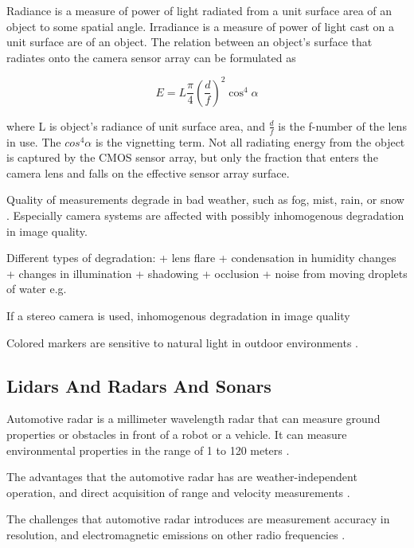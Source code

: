 \documentclass[12pt,a4paper,oneside,pdftex]{report}
\begin{document}
Radiance is a measure of power of light radiated from a unit surface area of an object to some spatial angle. 
Irradiance is a measure of power of light cast on a unit surface are of an object.
The relation between an object's surface that radiates onto the camera sensor array can be formulated as

\begin{equation}
\label{equation:radiance}
E = L \frac{\pi}{4} (\frac{d}{f})^2 \cos^4{\alpha}
\end{equation}

where L is object's radiance of unit surface area, and $\frac{d}{f}$ is the f-number of the lens in use. The $cos^4{\alpha}$ is the vignetting term. Not all radiating energy from the object is captured by the CMOS sensor array, but only the fraction that enters the camera lens and falls on the effective sensor array surface.


Quality of measurements degrade in bad weather, such as fog, mist, rain, or snow \cite{Kawai12}. 
Especially camera systems are affected with possibly inhomogenous degradation in image quality.

Different types of degradation:
    + lens flare
    + condensation in humidity changes
    + changes in illumination
    + shadowing
    + occlusion
    + noise from moving droplets of water e.g.

If a stereo camera is used, inhomogenous degradation in image quality


Colored markers are sensitive to natural light in outdoor environments \cite{Kawai12}.

    
\subsection{Lidars And Radars And Sonars}
\label{subsection:lidars_and_radars_and_sonars}

Automotive radar is a millimeter wavelength radar that can measure ground properties or obstacles in front of a robot or a vehicle. It can measure environmental properties in the range of 1 to 120 meters \cite{Ahtiainen12}.

The advantages that the automotive radar has are weather-independent operation, and direct acquisition of range and velocity measurements \cite{Wenger07}.

The challenges that automotive radar introduces are measurement accuracy in resolution, and electromagnetic emissions on other radio frequencies \cite{Wenger07}. 
\end{document}
